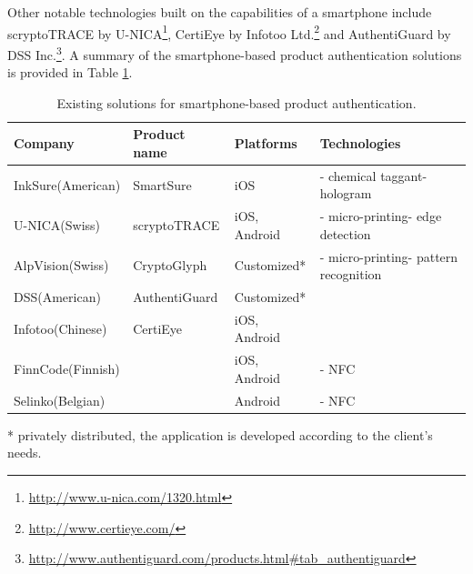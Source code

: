 \documentclass[thesis.tex]{subfiles}
\begin{document}
Other notable technologies built on the capabilities of a smartphone include scryptoTRACE\textregistered{} by U-NICA\footnote{\url{http://www.u-nica.com/1320.html}}, CertiEye by Infotoo Ltd.\footnote{\url{http://www.certieye.com/}} and AuthentiGuard by DSS Inc.\footnote{\url{http://www.authentiguard.com/products.html\#tab_authentiguard}}. A summary of the smartphone-based product authentication solutions is provided in Table \ref{table:existing-solutions}.

\begin{table}[hb]
	\caption{Existing solutions for smartphone-based product authentication.} \label{table:existing-solutions}

	\begin{center}
	\begin{tabular}{| m{2cm} | m{3.25cm} | m{3cm} | m{3.75cm} |}

		\hline
		\textbf{Company}				&	\textbf{Product name}			&	\textbf{Platforms}			&	\textbf{Technologies} \\ \hline
		InkSure\newline (American)		&	SmartSure						&	iOS						&	- chemical taggant\newline- hologram \\ \hline
		U-NICA\newline (Swiss)			&	scryptoTRACE\textregistered		&	iOS, Android				&	- micro-printing\newline- edge detection \\ \hline
		AlpVision\newline (Swiss)		&	CryptoGlyph\textregistered		&	Customized\footnotesize{*}	&	- micro-printing\newline- pattern recognition \\ \hline
		DSS\newline (American)			&	AuthentiGuard					&	Customized\footnotesize{*}	&	 \\ \hline
		Infotoo\newline (Chinese)		&	CertiEye						&	iOS, Android				&	 \\ \hline
		FinnCode\newline (Finnish)		&									&	iOS, Android				&	- NFC \\ \hline
		Selinko\newline (Belgian)		&									&	Android						&	- NFC \\
		\hline
	\end{tabular}
	\end{center}
	\scriptsize{*} \small{privately distributed, the application is developed according to the client's needs.}
\end{table}
\end{document}
